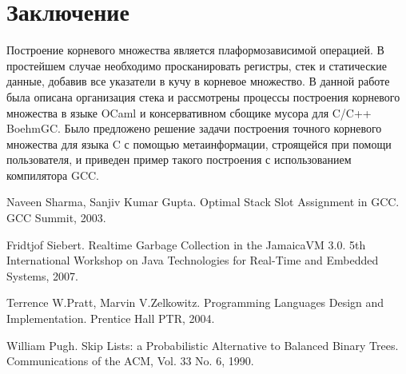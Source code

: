 \section*{Заключение}

Построение корневого множества является плаформозависимой операцией. В простейшем случае необходимо просканировать 
регистры, стек и статические данные, добавив все указатели в кучу в корневое множество. В данной работе была описана 
организация стека и рассмотрены процессы построения корневого множества в языке OCaml и консервативном сбощике мусора 
для C/C++ BoehmGC. Было предложено решение задачи построения точного корневого множества для языка C с помощью метаинформации, 
строящейся при помощи пользователя, и приведен пример такого построения с использованием компилятора GCC.

\begin{thebibliography}{99}
Naveen Sharma, Sanjiv Kumar Gupta. 
Optimal Stack Slot Assignment in GCC. GCC Summit, 2003.

Fridtjof Siebert. 
Realtime Garbage Collection in the JamaicaVM 3.0. 5th International Workshop on Java Technologies for Real-Time and Embedded Systems, 2007.

Terrence W.Pratt, Marvin V.Zelkowitz. 
Programming Languages Design and Implementation. Prentice Hall PTR, 2004.

William Pugh. Skip Lists: a Probabilistic Alternative to Balanced Binary Trees. Communications of the ACM, Vol. 33 No. 6, 1990.
\end{thebibliography}
